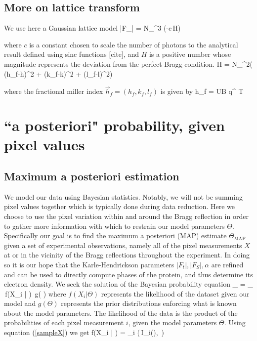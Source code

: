 \documentclass[dists.tex]{subfiles}
\begin{document}
\subsection{More on lattice transform}
We use here a Gaussian lattice model
\be
|F_| = N_^3 \exp (-c\,H)
\ee

where $c$ is a constant chosen to scale the number of photons to the analytical result defined using sinc functions [cite], and $H$ is a positive number whose magnitude  represents the deviation from the perfect Bragg condition.  
\be
H = N_^2( (h_f-h)^2 + (k_f-k)^2 + (l_f-l)^2)
\ee

where the fractional miller index $\vec h_f = (h_f,k_f,l_f)$ is given by
\be
\vec h_f = \matr U\cdot  \matr B \cdot \vec q^{\,\,T}
\ee

\section{``a posteriori" probability, given pixel values}
\subsection{Maximum a posteriori estimation}
We model our data using Bayesian statistics. Notably, we will not be summing pixel values together which is typically done during data reduction. Here we choose to use the pixel variation within and around the Bragg reflection in order to gather more information with which to restrain our model parameters $\Theta$. Specifically our goal is to find the maximum a posteriori (MAP) estimate $\Theta_\text{MAP}$ given a set of experimental observations, namely all of the pixel measurements $X$ at or in the vicinity of the Bragg reflections throughout the experiment. In doing so it is our hope that the Karle-Hendrickson parameters $|F_t|, |F_S|, \alpha$ are refined and can be used to directly compute phases of the protein, and thus determine its electron density. We seek the solution of the Bayesian probability equation 
\be \label{MAP}
\Theta_ = \argmax_{\Theta} {\,f(X_i | \Theta ) \,g( \Theta)}
\ee 
where $f(X_i | \Theta )$ represents the likelihood of the dataset given our model and $g(\Theta)$ represents the prior distributions enforcing what is known about the model parameters. The likelihood of the data is the product of the probabilities of each pixel measurement $i$, given the model parameters $\Theta$. Using equation (\ref{sampleX}) we get
\be
f(X_i | \Theta) = \prod_i  \left (\,I_i(\Theta),  \,\right )
\ee
\end{document}
